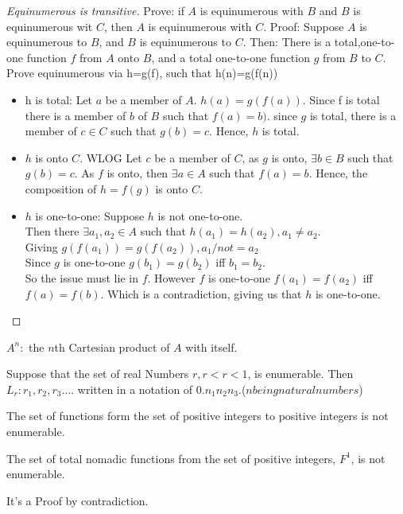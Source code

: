 \begin{proof}[Equinumerous is transitive]
Prove: if $A$ is equinumerous with $B$ and $B$ is equinumerous wit $C$, then $A$ is equinumerous with $C$.
Proof: Suppose $A$ is equinumerous to $B$, and $B$ is equinumerous to $C$. Then:
There is a total,one-to-one function $f$ from $A$ onto $B$, and a total one-to-one function $g$ from $B$ to $C$.
Prove equinumerous via h=g(f), such that h(n)=g(f(n))
\begin{itemize}
\item h is total: Let $a$ be a member of $A$. $h(a) = g(f(a))$. Since f is total there is a member of $b$ of $B$ such that $f(a)=b)$. since $g$ is total, there is a member of $c \in C$ such that $g(b)=c$. Hence, $h$ is total.
\item $h$ is onto $C$. WLOG Let $c$ be a member of $C$, as $g$ is onto, $\exists b \in B$ such that $g(b)=c$. As $f$ is onto, then $\exists a \in A $ such that $f(a)=b$. Hence, the composition of $h=f(g)$ is onto $C$.
\item $h$ is one-to-one: Suppose $h$ is not one-to-one. \\
Then there $\exists a_1,a_2 \in A$ such that $h(a_1)=h(a_2), a_1 \not = a_2$.\\
Giving $g(f(a_1))=g(f(a_2)), a_1 /not = a_2$\\
Since $g$ is one-to-one $g(b_1) = g(b_2)$ iff $b_1=b_2$. \\
So the issue must lie in $f$.  However $f$ is one-to-one $f(a_1) = f(a_2)$ iff $f(a) = f(b)$.
Which is a contradiction, giving us that $h$ is one-to-one.
\end{itemize}
\end{proof}



$A^{n}:$ the $n$th Cartesian product of $A$ with itself.


Suppose that the set of real Numbers $r, r \lt r \lt 1$, is enumerable.
Then $L_r : r_1,r_2,r_3....$ written in a notation of  $0.n_1 n_2 n_3$.($n being natural numbers$)

The set of functions form the set of positive integers to positive integers is not enumerable.

The set of total nomadic functions from the set of positive integers, $F^{1}$, is not enumerable.

It's a Proof by contradiction. %

